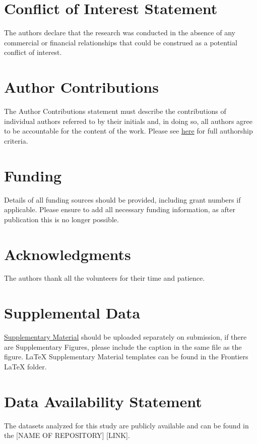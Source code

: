 \documentclass[utf8]{FrontiersinHarvard}
\begin{document}
\section*{Conflict of Interest Statement}
The authors declare that the research was conducted in the absence of any commercial or financial relationships that could be construed as a potential conflict of interest.

\section*{Author Contributions}
The Author Contributions statement must describe the contributions of individual authors referred to by their initials and, in doing so, all authors agree to be accountable for the content of the work.
Please see \href{https://www.frontiersin.org/about/policies-and-publication-ethics#AuthorshipAuthorResponsibilities}{here} for full authorship criteria.

\section*{Funding}
Details of all funding sources should be provided, including grant numbers if applicable.
Please ensure to add all necessary funding information, as after publication this is no longer possible.

\section*{Acknowledgments}
The authors thank all the volunteers for their time and patience.

\section*{Supplemental Data}
 \href{http://home.frontiersin.org/about/author-guidelines#SupplementaryMaterial}{Supplementary Material} should be uploaded separately on submission, if there are Supplementary Figures, please include the caption in the same file as the figure. LaTeX Supplementary Material templates can be found in the Frontiers LaTeX folder.

\section*{Data Availability Statement} \label{s:data_availability}
The datasets analyzed for this study are publicly available and can be found in the [NAME OF REPOSITORY] [LINK].



\end{document}

